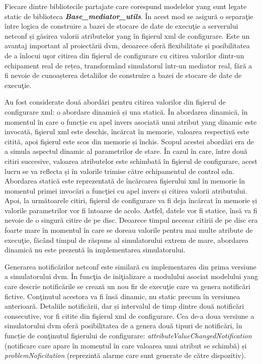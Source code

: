 Fiecare dintre bibliotecile partajate care corespund modelelor \gls{yang} sunt legate static de biblioteca \textit{\textbf{Base\_mediator\_utils}}. În acest mod se asigură o separaţie între logica de construire a bazei de stocare de date de execuţie a serverului \gls{netconf} și găsirea valorii atributelor \gls{yang} în fişierul \gls{xml} de configurare. Este un avantaj important al proiectării \gls{dvm}, deoarece oferă flexibilitate și posibilitatea de a înlocui uşor citirea din fişierul de configurare cu citirea valorilor dintr-un echipament real de rețea, transformând simulatorul într-un mediator real, fără a fi nevoie de cunoașterea detaliilor de construire a bazei de stocare de date de execuţie.

Au fost considerate două abordări pentru citirea valorilor din fişierul de configurare \gls{xml}: o abordare dinamică și una statică. În abordarea dinamică, în momentul în care o funcție cu apel invers asociată unui atribut \gls{yang} dinamic este invocată, fişierul \gls{xml} este deschis, încărcat în memorie, valoarea respectivă este citită, apoi fişierul este scos din memorie și închis. Scopul acestei abordări era de a simula aspectul dinamic al parametrilor de stare. În cazul în care, între două citiri succesive, valoarea atributelor este schimbată în fişierul de configurare, acest lucru se va reflecta și în valorile trimise către echipamentul de control \gls{sdn}. Abordarea statică este reprezentată de încărcarea fişierului \gls{xml} în memorie în momentul primei invocări a funcţiei cu apel invers și citirea valorii atributului. Apoi, la următoarele citiri, fişierul de configurare va fi deja încărcat în memorie și valorile parametrilor vor fi întoarse de acolo. Astfel, datele vor fi statice, însă va fi nevoie de o singură citire de pe disc. Deoarece timpul necesar citirii de pe disc era foarte mare în momentul în care se doreau valorile pentru mai multe atribute de execuţie, făcând timpul de răspuns al simulatorului extrem de mare, abordarea dinamică nu este prezentă în implementarea simulatorului.

Generarea notificărilor \gls{netconf} este similară cu implementarea din prima versiune a simulatorului \gls{dvm}. În funcţia de iniţializare a modulului asociat modelului \gls{yang} care descrie notificările se crează un nou fir de execuţie care va genera notificări fictive. Conţinutul acestora va fi însă dinamic, nu static precum în versiunea anterioară. Detaliile notificării, dar și intervalul de timp dintre două notificări consecutive, vor fi citite din fişierul \gls{xml} de configurare. Cea de-a doua versiune a simulatorului \gls{dvm} oferă posibilitatea de a genera două tipuri de notificări, în funcție de conţinutul fişierului de configurare: \textit{attributeValueChangedNotification} (notificare care apare în momentul în care valoarea unui atribut se schimbă) și \textit{problemNoficitation} (reprezintă alarme care sunt generate de către dispozitiv).

